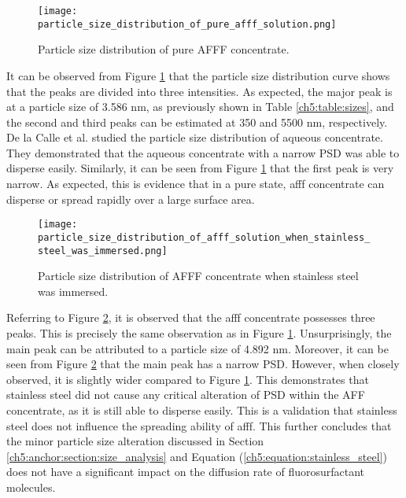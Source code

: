 \begin{figure}[H]
    \centering
    \texttt{[image: particle\_size\_distribution\_of\_pure\_afff\_solution.png]}
    \caption{Particle size distribution of pure AFFF concentrate.}
    \label{ch5:figure:pure_afff}
\end{figure}

It can be observed from Figure \ref{ch5:figure:pure_afff} that the particle size distribution curve shows that the peaks are divided into three intensities. As expected, the major peak is at a particle size of 3.586 nm, as previously shown in Table \ref{ch5:table:sizes}, and the second and third peaks can be estimated at 350 and 5500 nm, respectively. De la Calle et al. \cite{de2017detection} studied the particle size distribution of aqueous concentrate. They demonstrated that the aqueous concentrate with a narrow PSD was able to disperse easily. Similarly, it can be seen from Figure \ref{ch5:figure:pure_afff} that the first peak is very narrow. As expected, this is evidence that in a pure state, \acrshort{afff} concentrate can disperse or spread rapidly over a large surface area.

\begin{figure}[H]
    \centering
    \texttt{[image: particle\_size\_distribution\_of\_afff\_solution\_when\_stainless\_steel\_was\_immersed.png]}
    \caption{Particle size distribution of AFFF concentrate when stainless steel was immersed.}
    \label{ch5:figure:stainless_steel}
\end{figure}

Referring to Figure \ref{ch5:figure:stainless_steel}, it is observed that the \acrshort{afff} concentrate possesses three peaks. This is precisely the same observation as in Figure \ref{ch5:figure:pure_afff}. Unsurprisingly, the main peak can be attributed to a particle size of 4.892 nm. Moreover, it can be seen from Figure \ref{ch5:figure:stainless_steel} that the main peak has a narrow PSD. However, when closely observed, it is slightly wider compared to Figure \ref{ch5:figure:pure_afff}. This demonstrates that stainless steel did not cause any critical alteration of PSD within the AFF concentrate, as it is still able to disperse easily. This is a validation that stainless steel does not influence the spreading ability of \acrshort{afff}. This further concludes that the minor particle size alteration discussed in Section \ref{ch5:anchor:section:size_analysis} and Equation (\ref{ch5:equation:stainless_steel}) does not have a significant impact on the diffusion rate of fluorosurfactant molecules.   
  
